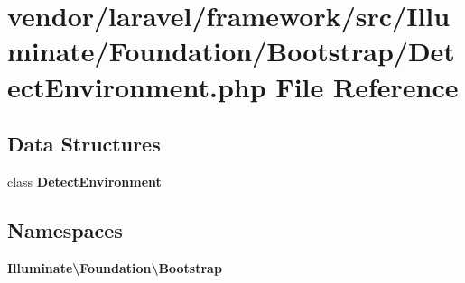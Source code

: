 \section{vendor/laravel/framework/src/\+Illuminate/\+Foundation/\+Bootstrap/\+Detect\+Environment.php File Reference}
\label{_detect_environment_8php}
\subsection*{Data Structures}
\begin{DoxyCompactItemize}
\item 
class {\bf Detect\+Environment}
\end{DoxyCompactItemize}
\subsection*{Namespaces}
\begin{DoxyCompactItemize}
\item 
 {\bf Illuminate\textbackslash{}\+Foundation\textbackslash{}\+Bootstrap}
\end{DoxyCompactItemize}
